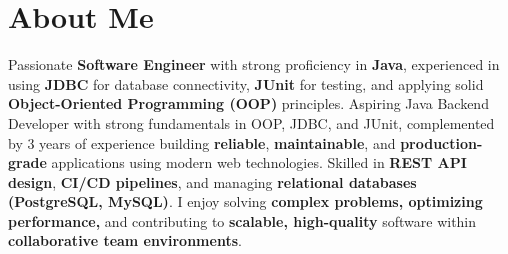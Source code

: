 \section{About Me}

Passionate \textbf{Software Engineer} with strong proficiency in \textbf{Java}, experienced in using \textbf{JDBC} for database connectivity, \textbf{JUnit} for testing, and applying solid \textbf{Object-Oriented Programming (OOP)} principles. Aspiring Java Backend Developer with strong fundamentals in OOP, JDBC, and JUnit, complemented by 3 years of experience building \textbf{reliable}, \textbf{maintainable}, and \textbf{production-grade} applications using modern web technologies. Skilled in \textbf{REST API design}, \textbf{CI/CD pipelines}, and managing \textbf{relational databases (PostgreSQL, MySQL)}. I enjoy solving \textbf{complex problems, optimizing performance,} and contributing to \textbf{scalable, high-quality} software within \textbf{collaborative team environments}.

